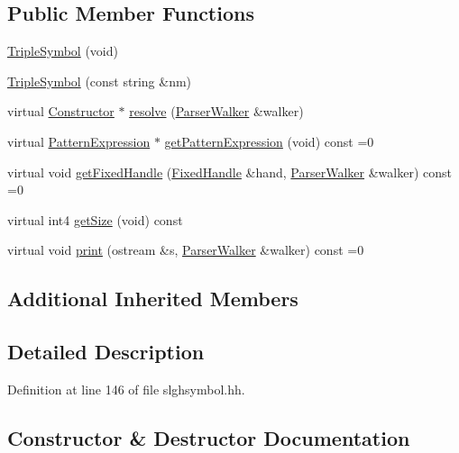 \subsection*{Public Member Functions}
\begin{DoxyCompactItemize}
\item 
\mbox{\hyperlink{class_triple_symbol_af422889722be7e392a07ca4c6cf5355f}{Triple\+Symbol}} (void)
\item 
\mbox{\hyperlink{class_triple_symbol_a3f2abb9e42aa1c94d7ea7ae9611d09b2}{Triple\+Symbol}} (const string \&nm)
\item 
virtual \mbox{\hyperlink{class_constructor}{Constructor}} $\ast$ \mbox{\hyperlink{class_triple_symbol_adc7ba86d4674c1b3cc8894cfcac33bf1}{resolve}} (\mbox{\hyperlink{class_parser_walker}{Parser\+Walker}} \&walker)
\item 
virtual \mbox{\hyperlink{class_pattern_expression}{Pattern\+Expression}} $\ast$ \mbox{\hyperlink{class_triple_symbol_a213895658c5fe547edf9ac54a1d2de2e}{get\+Pattern\+Expression}} (void) const =0
\item 
virtual void \mbox{\hyperlink{class_triple_symbol_aa71f48c79a2bee73e97fdfb8163b4e46}{get\+Fixed\+Handle}} (\mbox{\hyperlink{struct_fixed_handle}{Fixed\+Handle}} \&hand, \mbox{\hyperlink{class_parser_walker}{Parser\+Walker}} \&walker) const =0
\item 
virtual int4 \mbox{\hyperlink{class_triple_symbol_a7351de4a1db140381d0b7913a8c613fd}{get\+Size}} (void) const
\item 
virtual void \mbox{\hyperlink{class_triple_symbol_a205c4487d3ad54532097dd77eb4501fc}{print}} (ostream \&s, \mbox{\hyperlink{class_parser_walker}{Parser\+Walker}} \&walker) const =0
\end{DoxyCompactItemize}
\subsection*{Additional Inherited Members}


\subsection{Detailed Description}


Definition at line 146 of file slghsymbol.\+hh.



\subsection{Constructor \& Destructor Documentation}
\mbox{\label{class_triple_symbol_af422889722be7e392a07ca4c6cf5355f}} 
